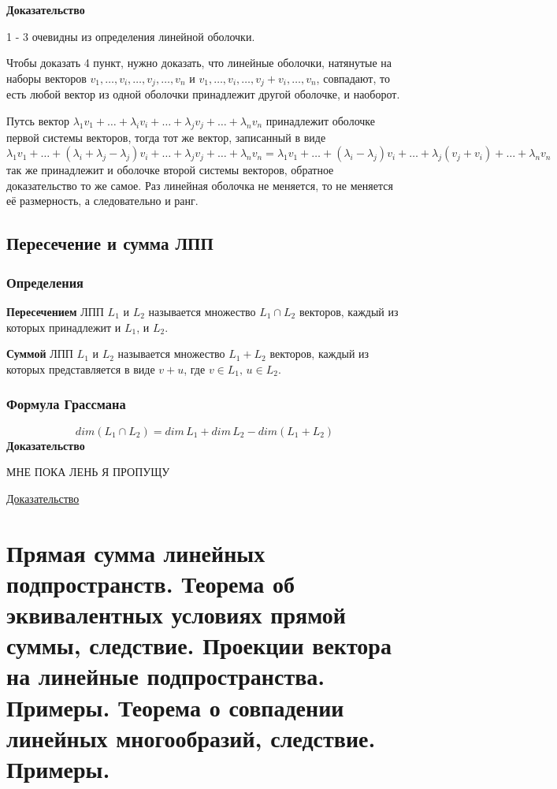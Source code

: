 \documentclass{article}
\begin{document}
\textbf{Доказательство}

1 - 3 очевидны из определения линейной оболочки.

Чтобы доказать 4 пункт, нужно доказать, что линейные оболочки, натянутые на наборы векторов $v_1,\ldots,v_i,\ldots,v_j,\ldots,v_n$ и $v_1,\ldots,v_i,\ldots,v_j+v_i,\ldots,v_n$, совпадают, то есть любой вектор из одной оболочки принадлежит другой оболочке, и наоборот.

Путсь вектор $\lambda_1 v_1+\ldots+\lambda_i v_i+\ldots+\lambda_j v_j+\ldots+\lambda_n v_n$ принадлежит оболочке первой системы векторов, тогда тот же вектор, записанный в виде $\lambda_1 v_1+\ldots+(\lambda_i+\lambda_j-\lambda_j)v_i+\ldots+\lambda_j v_j+\ldots+\lambda_n v_n=\lambda_1 v_1+\ldots+(\lambda_i-\lambda_j)v_i+\ldots+\lambda_j(v_j+v_i)+\ldots+\lambda_n v_n$ так же принадлежит и оболочке второй системы векторов, обратное доказательство то же самое. Раз линейная оболочка не меняется, то не меняется её размерность, а следовательно и ранг.

\subsection{Пересечение и сумма ЛПП}
\subsubsection{Определения}
\textbf{Пересечением} ЛПП $L_1$ и  $L_2$ называется множество $L_1\cap L_2$ векторов, каждый из которых принадлежит и $L_1$, и $L_2$. 

\textbf{Суммой} ЛПП $L_1$ и $L_2$ называется множество $L_1+L_2$ векторов, каждый из которых представляется в виде $v+u$, где $v\in L_1,\,u\in L_2$.

\subsubsection{Формула Грассмана}
$$ dim(L_1\cap L_2)=dim\,L_1+dim\,L_2-dim(L_1+L_2)$$
\textbf{Доказательство}

МНЕ ПОКА ЛЕНЬ Я ПРОПУЩУ

\href{http://mathhelpplanet.com/static.php?p=peresechenie-i-summa-podprostranstv}{Доказательство}

\newpage
\section{Прямая сумма линейных подпространств. Теорема об эквивалентных условиях прямой суммы, следствие. Проекции вектора на линейные подпространства. Примеры. Теорема о совпадении линейных многообразий, следствие. Примеры.}
\end{document}
